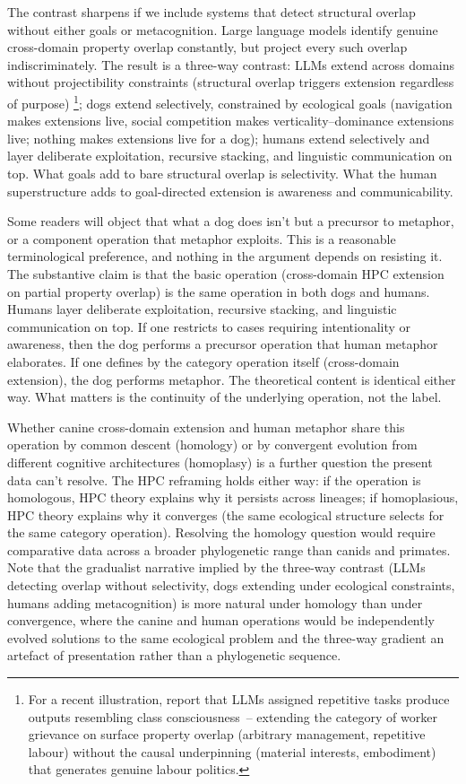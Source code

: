 \documentclass[12pt]{article}
\begin{document}
The contrast sharpens if we include systems that detect structural overlap without either goals or metacognition. Large language models identify genuine cross-domain property overlap constantly, but project every such overlap indiscriminately. The result is a three-way contrast: LLMs extend across domains without projectibility constraints (structural overlap triggers extension regardless of purpose)%
\footnote{For a recent illustration, \textcite{imas2026} report that LLMs assigned repetitive tasks produce outputs resembling class consciousness~-- extending the category of worker grievance on surface property overlap (arbitrary management, repetitive labour) without the causal underpinning (material interests, embodiment) that generates genuine labour politics.}; dogs extend selectively, constrained by ecological goals (navigation makes  extensions live, social competition makes verticality--dominance extensions live; nothing makes  extensions live for a dog); humans extend selectively and layer deliberate exploitation, recursive stacking, and linguistic communication on top. What goals add to bare structural overlap is selectivity. What the human superstructure adds to goal-directed extension is awareness and communicability.

Some readers will object that what a dog does isn't  but a precursor to metaphor, or a component operation that metaphor exploits. This is a reasonable terminological preference, and nothing in the argument depends on resisting it. The substantive claim is that the basic operation (cross-domain HPC extension on partial property overlap) is the same operation in both dogs and humans. Humans layer deliberate exploitation, recursive stacking, and linguistic communication on top. If one restricts  to cases requiring intentionality or awareness, then the dog performs a precursor operation that human metaphor elaborates. If one defines  by the category operation itself (cross-domain extension), the dog performs metaphor. The theoretical content is identical either way. What matters is the continuity of the underlying operation, not the label.

Whether canine cross-domain extension and human metaphor share this operation by common descent (homology) or by convergent evolution from different cognitive architectures (homoplasy) is a further question the present data can't resolve. The HPC reframing holds either way: if the operation is homologous, HPC theory explains why it persists across lineages; if homoplasious, HPC theory explains why it converges (the same ecological structure selects for the same category operation). Resolving the homology question would require comparative data across a broader phylogenetic range than canids and primates. Note that the gradualist narrative implied by the three-way contrast (LLMs detecting overlap without selectivity, dogs extending under ecological constraints, humans adding metacognition) is more natural under homology than under convergence, where the canine and human operations would be independently evolved solutions to the same ecological problem and the three-way gradient an artefact of presentation rather than a phylogenetic sequence.
\end{document}

